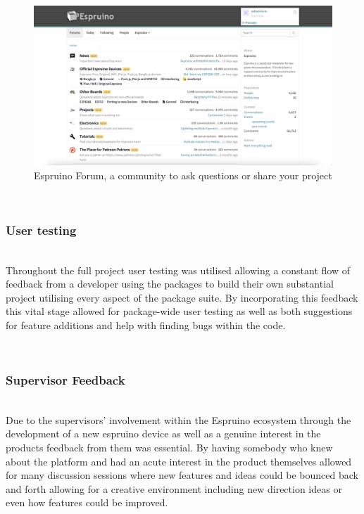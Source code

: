 \documentclass{l4proj}
\begin{document}
\begin{figure}[!ht]
    \centering
    \includegraphics[width=12cm]{dissertation/images/espruino-forum.png}
    \caption{Espruino Forum, a community to ask questions or share your project}
    \label{fig:espruino-forum}
\end{figure}

\text \\
\subsubsection{User testing}\hfill\\
Throughout the full project user testing was utilised allowing a constant flow of feedback from a developer using the packages to build their own substantial project utilising every aspect of the package suite. By incorporating this feedback this vital stage allowed for package-wide user testing as well as both suggestions for feature additions and help with finding bugs within the code.

\text \\
\subsubsection{Supervisor Feedback}\hfill\\
Due to the supervisors' involvement within the Espruino ecosystem through the development of a new espruino device as well as a genuine interest in the products feedback from them was essential. By having somebody who knew about the platform and had an acute interest in the product themselves allowed for many discussion sessions where new features and ideas could be bounced back and forth allowing for a creative environment including new direction ideas or even how features could be improved.

\text \\
\end{document}
